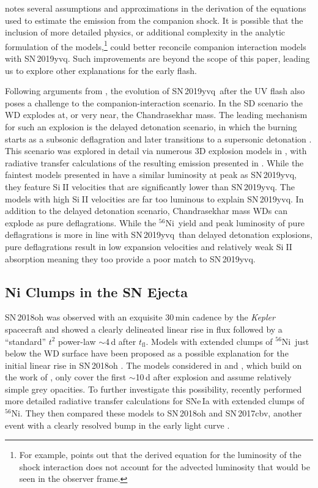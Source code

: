 \documentclass[twocolumn]{aastex63}
\def\ion#1#2{#1$\;${\footnotesize\rm{#2}}\relax}
\newcommand{\tfl}{$t_\mathrm{fl}$}
\newcommand{\radni}{$^{56}$Ni}
\newcommand{\sn}{SN\,2019yvq}
\begin{document}
\citet{Kasen10a} notes several assumptions and approximations in the
derivation of the equations used to estimate the emission from the companion
shock. It is possible that the inclusion of more detailed physics, or
additional complexity in the analytic formulation of the models,\footnote{For
example, \citet{Kasen10a} points out that the derived equation for the
luminosity of the shock interaction does not account for the advected
luminosity that would be seen in the observer frame.} could better reconcile
companion interaction models with \sn. Such improvements are beyond the scope
of this paper, leading us to explore other explanations for the early flash.

Following arguments from \citet{Kromer16}, the evolution of \sn\ after the UV
flash also poses a challenge to the companion-interaction scenario. In the SD
scenario the WD explodes at, or very near, the Chandrasekhar mass. The leading
mechanism for such an explosion is the delayed detonation scenario, in which
the burning starts as a subsonic deflagration and later transitions to a
supersonic detonation \citep{Khokhlov91}. This scenario was explored in detail
via numerous 3D explosion models in \citet{Seitenzahl13}, with radiative
transfer calculations of the resulting emission presented in \citet{Sim13}.
While the faintest models presented in \citet{Sim13} have a similar luminosity
at peak as \sn, they feature \ion{Si}{II} velocities that are significantly
lower than \sn. The \citeauthor{Sim13} models with high \ion{Si}{II}
velocities are far too luminous to explain \sn. In addition to the delayed
detonation scenario, Chandrasekhar mass WDs can explode as pure deflagrations.
While the \radni\ yield and peak luminosity of pure deflagrations is more in
line with \sn\ than delayed detonation explosions, pure deflagrations result
in low expansion velocities and relatively weak \ion{Si}{II} absorption
\citep[e.g.,][]{Fink14} meaning they too provide a poor match to \sn.

\subsection{Ni Clumps in the SN Ejecta}

SN\,2018oh was observed with an exquisite 30\,min cadence by the
\textit{Kepler} spacecraft and showed a clearly delineated linear rise in flux
followed by a ``standard'' $t^2$ power-law $\sim$4\,d after \tfl. Models with
extended clumps of \radni\ just below the WD surface have been proposed as a
possible explanation for the initial linear rise in SN\,2018oh
\citep{Shappee19,Dimitriadis19}. The models considered in \citet{Shappee19}
and \citet{Dimitriadis19}, which build on the work of \citet{Piro16}, only
cover the first $\sim$10\,d after explosion and assume relatively simple grey
opacities. To further investigate this possibility, \citet{Magee20a} recently
performed more detailed radiative transfer calculations for SNe\,Ia with
extended clumps of \radni. They then compared these models to SN\,2018oh and
SN\,2017cbv, another event with a clearly resolved bump in the early light
curve \citep{Hosseinzadeh17}.
\end{document}
